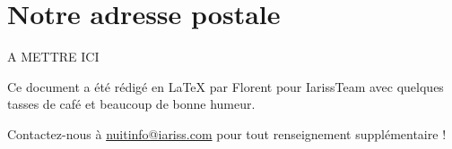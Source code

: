 \documentclass[12pt, a4paper]{article}
\newcommand{\espace}{\vspace{.8cm}}
\newcommand{\authors}{Florent}
\begin{document}
\espace{}
\section*{Notre adresse postale}
A METTRE ICI

\espace\vfill{}
Ce document a été rédigé en \LaTeX{} par \authors{} pour IarissTeam avec quelques tasses de café et beaucoup de bonne humeur.

Contactez-nous à \href{mailto:nuitinfo@iariss.com}{nuitinfo@iariss.com} pour tout renseignement supplémentaire !
\end{document}
